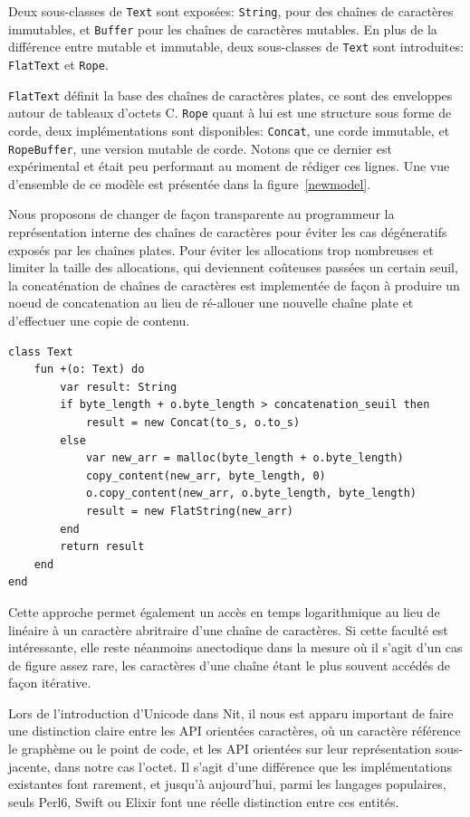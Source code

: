 Deux sous-classes de \texttt{Text} sont exposées: \texttt{String}, pour des chaînes de caractères immutables, et \texttt{Buffer}
pour les chaînes de caractères mutables.
En plus de la différence entre mutable et immutable, deux sous-classes de \texttt{Text} sont
introduites: \texttt{FlatText} et \texttt{Rope}.

\texttt{FlatText} définit la base des chaînes de caractères plates, ce sont des enveloppes autour de tableaux d'octets C.
\texttt{Rope} quant à lui est une structure sous forme de corde, deux implémentations sont disponibles: \texttt{Concat}, une
corde immutable, et \texttt{RopeBuffer}, une version mutable de corde.
Notons que ce dernier est expérimental et était peu performant au moment de rédiger ces lignes.
Une vue d'ensemble de ce modèle est présentée dans la figure~\ref{newmodel}.

Nous proposons de changer de façon transparente au programmeur la représentation interne des
chaînes de caractères pour éviter les cas dégéneratifs exposés par les chaînes plates.
Pour éviter les allocations trop nombreuses et limiter la taille des allocations, qui
deviennent coûteuses passées un certain seuil,
la concaténation de chaînes de caractères est implementée
de façon à produire un noeud de concatenation au lieu de ré-allouer une nouvelle
chaîne plate et d'effectuer une copie de contenu.

\begin{Verbatim}[obeytabs,tabsize=4]
class Text
	fun +(o: Text) do
		var result: String
		if byte_length + o.byte_length > concatenation_seuil then
			result = new Concat(to_s, o.to_s)
		else
			var new_arr = malloc(byte_length + o.byte_length)
			copy_content(new_arr, byte_length, 0)
			o.copy_content(new_arr, o.byte_length, byte_length)
			result = new FlatString(new_arr)
		end
		return result
	end
end
\end{Verbatim}

Cette approche permet également un accès en temps logarithmique au lieu de linéaire
à un caractère abritraire d'une chaîne de caractères.
Si cette faculté est intéressante, elle reste néanmoins anectodique dans la mesure où il s'agit d'un cas de
figure assez rare, les caractères d'une chaîne étant le plus souvent accédés de façon itérative.

Lors de l'introduction d'Unicode dans Nit, il nous est apparu important de faire une distinction claire entre les API
orientées caractères, où un caractère référence le graphème ou le point de code, et les
API orientées sur leur représentation sous-jacente, dans notre cas l'octet.
Il s'agit d'une différence que les implémentations existantes font rarement, et jusqu'à aujourd'hui, parmi les
langages populaires, seuls Perl6, Swift ou Elixir font une réelle distinction entre ces entités.

